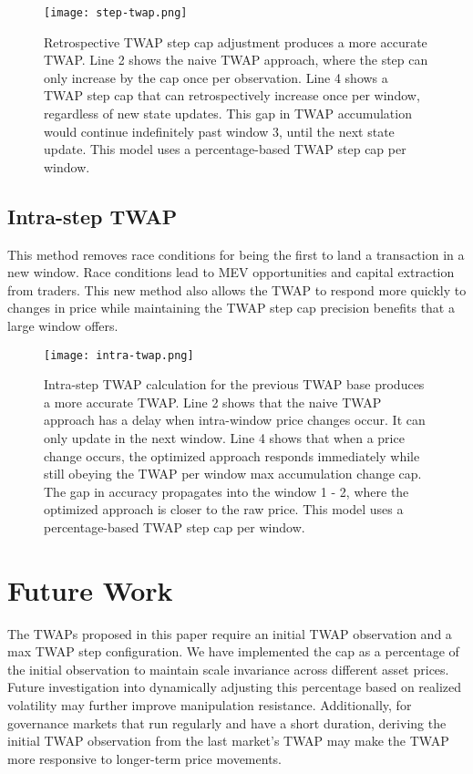 \documentclass{article}
\begin{document}
\begin{figure}[H]
    \centering
    \texttt{[image: step-twap.png]}
    \caption{Retrospective TWAP step cap adjustment produces a more accurate TWAP. Line 2 shows the naive TWAP approach, where the step can only increase by the cap once per observation. Line 4 shows a TWAP step cap that can retrospectively increase once per window, regardless of new state updates. This gap in TWAP accumulation would continue indefinitely past window 3, until the next state update. This model uses a percentage-based TWAP step cap per window.}
    \label{fig:enter-label}
\end{figure}

\subsection{Intra-step TWAP}
This method removes race conditions for being the first to land a transaction in a new window. Race conditions lead to MEV opportunities and capital extraction from traders. This new method also allows the TWAP to respond more quickly to changes in price while maintaining the TWAP step cap precision benefits that a large window offers.

\begin{figure}[H]
    \centering
    \texttt{[image: intra-twap.png]}
    \caption{Intra-step TWAP calculation for the previous TWAP base produces a more accurate TWAP. Line 2 shows that the naive TWAP approach has a delay when intra-window price changes occur. It can only update in the next window. Line 4 shows that when a price change occurs, the optimized approach responds immediately while still obeying the TWAP per window max accumulation change cap. The gap in accuracy propagates into the window 1 - 2, where the optimized approach is closer to the raw price. This model uses a percentage-based TWAP step cap per window.}
    \label{fig:enter-label}
\end{figure}

\section{Future Work}
The TWAPs proposed in this paper require an initial TWAP observation and a max TWAP step configuration. We have implemented the cap as a percentage of the initial observation to maintain scale invariance across different asset prices. Future investigation into dynamically adjusting this percentage based on realized volatility may further improve manipulation resistance. Additionally, for governance markets that run regularly and have a short duration, deriving the initial TWAP observation from the last market's TWAP may make the TWAP more responsive to longer-term price movements.

\nocite{*}                %
\end{document}
